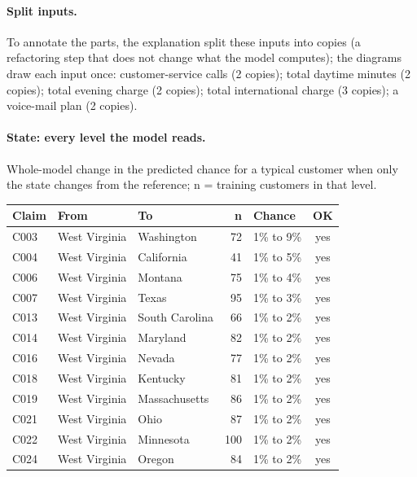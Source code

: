 \documentclass[a4paper,10pt]{article}
\newif\ifreviewmarks
\newcommand{\reviewrule}{\noindent{\color{BrickRed}\rule{\linewidth}{0.8pt}}}
\newenvironment{drafted}[1][]{%
  \ifreviewmarks\par\addvspace{\medskipamount}\reviewrule\par\nopagebreak
  \noindent{\color{BrickRed}\sffamily\footnotesize\textbf{Thesis Draft}\quad #1\hfill review}\par\nopagebreak\smallskip\fi}{%
  \ifreviewmarks\par\smallskip\noindent{\color{BrickRed}\sffamily\footnotesize end of thesis draft}\par\nopagebreak\reviewrule\par\medskip\fi}
\begin{document}
\begin{drafted}[plain-language layer: churn100-s2-c2]
\paragraph{Split inputs.} To annotate the parts, the explanation split these inputs into copies (a refactoring step that does not change what the model computes); the diagrams draw each input once: customer-service calls (2 copies); total daytime minutes (2 copies); total evening charge (2 copies); total international charge (3 copies); a voice-mail plan (2 copies).
\paragraph{State: every level the model reads.} Whole-model change in the predicted chance for a typical customer when only the state changes from the reference; n = training customers in that level.\par\smallskip
{\scriptsize{}
\begin{longtable}{@{}lllrlc@{}}
\toprule\rowcolor{white}
Claim & From & To & n & Chance & OK \\
\midrule\endhead
\bottomrule\endfoot
C003 & West Virginia & Washington & 72 & 1\% to 9\% & \textcolor{OliveGreen}{yes} \\
C004 & West Virginia & California & 41 & 1\% to 5\% & \textcolor{OliveGreen}{yes} \\
C006 & West Virginia & Montana & 75 & 1\% to 4\% & \textcolor{OliveGreen}{yes} \\
C007 & West Virginia & Texas & 95 & 1\% to 3\% & \textcolor{OliveGreen}{yes} \\
C013 & West Virginia & South Carolina & 66 & 1\% to 2\% & \textcolor{OliveGreen}{yes} \\
C014 & West Virginia & Maryland & 82 & 1\% to 2\% & \textcolor{OliveGreen}{yes} \\
C016 & West Virginia & Nevada & 77 & 1\% to 2\% & \textcolor{OliveGreen}{yes} \\
C018 & West Virginia & Kentucky & 81 & 1\% to 2\% & \textcolor{OliveGreen}{yes} \\
C019 & West Virginia & Massachusetts & 86 & 1\% to 2\% & \textcolor{OliveGreen}{yes} \\
C021 & West Virginia & Ohio & 87 & 1\% to 2\% & \textcolor{OliveGreen}{yes} \\
C022 & West Virginia & Minnesota & 100 & 1\% to 2\% & \textcolor{OliveGreen}{yes} \\
C024 & West Virginia & Oregon & 84 & 1\% to 2\% & \textcolor{OliveGreen}{yes} \\

\end{longtable}}
\end{drafted}
\end{document}
